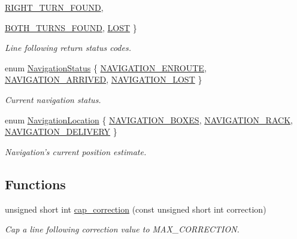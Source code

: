 \begin{DoxyCompactItemize}
\hyperlink{namespaceIDP_a5993bdfdd901fc5521c8df42dca43bd0a4e943d3404f29cc547855d1097727e63}{RIGHT\_\-TURN\_\-FOUND}, 
\par
\hyperlink{namespaceIDP_a5993bdfdd901fc5521c8df42dca43bd0adb771c4661fabd68ed4c31c504088e93}{BOTH\_\-TURNS\_\-FOUND}, 
\hyperlink{namespaceIDP_a5993bdfdd901fc5521c8df42dca43bd0ab68c7dd029c69ce53f446acabd19455c}{LOST}
 \}
\begin{DoxyCompactList}\small\item\em Line following return status codes. \item\end{DoxyCompactList}\item 
enum \hyperlink{namespaceIDP_a1a96e566e4d675fdf20780cc96d92283}{NavigationStatus} \{ \hyperlink{namespaceIDP_a1a96e566e4d675fdf20780cc96d92283a9f52fe7970aefcb1b74e9aea3798f39d}{NAVIGATION\_\-ENROUTE}, 
\hyperlink{namespaceIDP_a1a96e566e4d675fdf20780cc96d92283ab9e83c995cb23a5782b23b198dcbabcb}{NAVIGATION\_\-ARRIVED}, 
\hyperlink{namespaceIDP_a1a96e566e4d675fdf20780cc96d92283ad75d1c5522e0a38dbe62266912d411ba}{NAVIGATION\_\-LOST}
 \}
\begin{DoxyCompactList}\small\item\em Current navigation status. \item\end{DoxyCompactList}\item 
enum \hyperlink{namespaceIDP_ab9c412f0fd539b5d70385066c30465a0}{NavigationLocation} \{ \hyperlink{namespaceIDP_ab9c412f0fd539b5d70385066c30465a0a0cfb642ce5e4133706998843eb3c8da1}{NAVIGATION\_\-BOXES}, 
\hyperlink{namespaceIDP_ab9c412f0fd539b5d70385066c30465a0af1bde0912725a75705d0fb74637f20c1}{NAVIGATION\_\-RACK}, 
\hyperlink{namespaceIDP_ab9c412f0fd539b5d70385066c30465a0a10e09a3f2969d951f0dc233cb76eb4bf}{NAVIGATION\_\-DELIVERY}
 \}
\begin{DoxyCompactList}\small\item\em Navigation's current position estimate. \item\end{DoxyCompactList}\end{DoxyCompactItemize}
\subsection*{Functions}
\begin{DoxyCompactItemize}
\item 
unsigned short int \hyperlink{namespaceIDP_ae66b1b69bcde3ba7995f2fd46c6f21f5}{cap\_\-correction} (const unsigned short int correction)
\begin{DoxyCompactList}\small\item\em Cap a line following correction value to MAX\_\-CORRECTION. \item\end{DoxyCompactList}\end{DoxyCompactItemize}
